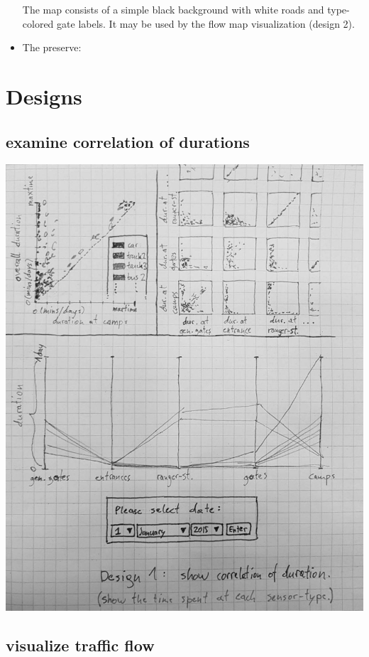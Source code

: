 \documentclass{article}
\begin{document}
\begin{itemize}
	The map consists of a simple black background with white roads and type-colored gate labels. It may be used by the flow map visualization (design 2).
\item The preserve:

\end{itemize}

\section{Designs}
\subsection{examine correlation of durations}
\begin{center}
\includegraphics[scale=.5]{Design1.jpg}
\end{center}

\subsection{visualize traffic flow}
\end{document}
